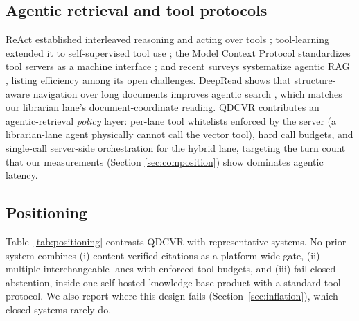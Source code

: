 \subsection{Agentic retrieval and tool protocols}
ReAct established interleaved reasoning and acting over tools
\cite{react-yao}; tool-learning extended it to self-supervised tool use
\cite{toolformer}; the Model Context Protocol standardizes tool servers as a
machine interface \cite{mcp}; and recent surveys systematize agentic RAG
\cite{singh-agentic-rag}, listing efficiency among its open challenges.
DeepRead shows that structure-aware navigation over
long documents improves agentic search \cite{deepread}, which matches our
librarian lane's document-coordinate reading. QDCVR contributes an
agentic-retrieval \emph{policy} layer: per-lane tool whitelists enforced by
the server (a librarian-lane agent physically cannot call the vector tool),
hard call budgets, and single-call server-side orchestration for the hybrid
lane, targeting the turn count that our measurements (Section
\ref{sec:composition}) show dominates agentic latency.

\subsection{Positioning}
Table~\ref{tab:positioning} contrasts QDCVR with representative systems.
No prior system combines (i) content-verified citations as a platform-wide
gate, (ii) multiple interchangeable lanes with enforced tool budgets, and
(iii) fail-closed abstention, inside one self-hosted knowledge-base product
with a standard tool protocol. We also report where this design fails
(Section~\ref{sec:inflation}), which closed systems rarely do.

